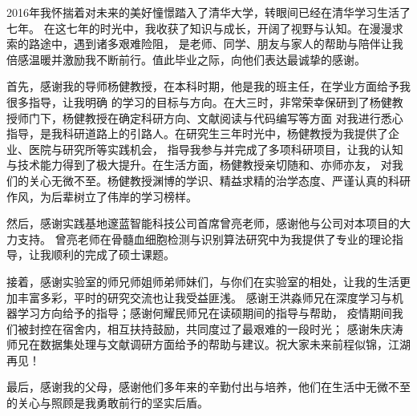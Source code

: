 
\begin{acknowledgements}
2016年我怀揣着对未来的美好憧憬踏入了清华大学，转眼间已经在清华学习生活了七年。
在这七年的时光中，我收获了知识与成长，开阔了视野与认知。在漫漫求索的路途中，遇到诸多艰难险阻，
是老师、同学、朋友与家人的帮助与陪伴让我倍感温暖并激励我不断前行。值此毕业之际，向他们表达最诚挚的感谢。

首先，感谢我的导师杨健教授，在本科时期，他是我的班主任，在学业方面给予我很多指导，让我明确
的学习的目标与方向。在大三时，非常荣幸保研到了杨健教授师门下，杨健教授在确定科研方向、文献阅读与代码编写等方面
对我进行悉心指导，是我科研道路上的引路人。在研究生三年时光中，杨健教授为我提供了企业、医院与研究所等实践机会，
指导我参与并完成了多项科研项目，让我的认知与技术能力得到了极大提升。在生活方面，杨健教授亲切随和、亦师亦友，
对我们的关心无微不至。杨健教授渊博的学识、精益求精的治学态度、严谨认真的科研作风，为后辈树立了伟岸的学习榜样。

然后，感谢实践基地邃蓝智能科技公司首席曾亮老师，感谢他与公司对本项目的大力支持。
曾亮老师在骨髓血细胞检测与识别算法研究中为我提供了专业的理论指导，让我顺利的完成了硕士课题。

接着，感谢实验室的师兄师姐师弟师妹们，与你们在实验室的相处，让我的生活更加丰富多彩，平时的研究交流也让我受益匪浅。
感谢王洪淼师兄在深度学习与机器学习方向给予的指导；感谢何耀民师兄在读硕期间的指导与帮助，
疫情期间我们被封控在宿舍内，相互扶持鼓励，共同度过了最艰难的一段时光；
感谢朱庆涛师兄在数据集处理与文献调研方面给予的帮助与建议。祝大家未来前程似锦，江湖再见！

最后，感谢我的父母，感谢他们多年来的辛勤付出与培养，他们在生活中无微不至的关心与照顾是我勇敢前行的坚实后盾。







\end{acknowledgements}
